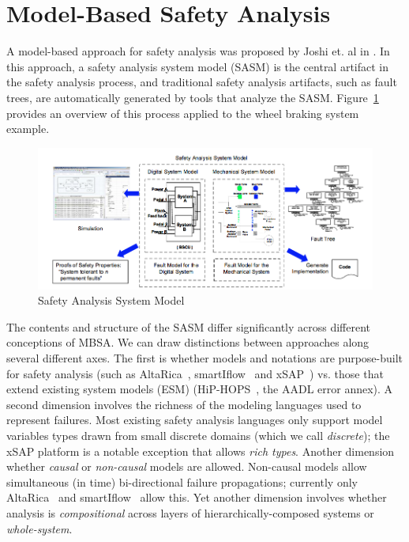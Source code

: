 \section{Model-Based Safety Analysis}


A model-based approach for safety analysis was proposed by Joshi et. al in \cite{Joshi05:Dasc, Joshi05:SafeComp, Joshi07:Hase}.  In this approach, a safety analysis system model (SASM) is the central artifact in the safety analysis process, and traditional safety analysis artifacts, such as fault trees, are automatically generated by tools that analyze the SASM. Figure~\ref{fig:sasm} provides an overview of this process applied to the wheel braking system example.

\begin{figure}
  \centering
 \includegraphics[width=1\textwidth]{images/SASM.png}
  \vspace{-0.1in}
  \caption{Safety Analysis System Model}
  \label{fig:sasm}
\end{figure}

The contents and structure of the SASM differ significantly across different conceptions of MBSA.  We can draw distinctions between approaches along several different axes.  The first is whether models and notations are purpose-built for safety analysis (such as AltaRica~\cite{PROSVIRNOVA2013127}, smartIflow~\cite{info8010007} and xSAP~\cite{DBLP:conf/tacas/BittnerBCCGGMMZ16}) vs. those that extend existing system models (ESM) (HiP-HOPS~\cite{CHEN201391}, the AADL error annex\cite{SAEAS}).  A second dimension involves the richness of the modeling languages used to represent failures.  Most existing safety analysis languages only support model variables types drawn from small discrete domains (which we call {\em discrete}); the xSAP platform is a notable exception that allows {\em rich types}.  Another dimension whether {\em causal } or {\em non-causal} models are allowed.  Non-causal models allow simultaneous (in time) bi-directional failure propagations; currently only AltaRica~\cite{PROSVIRNOVA2013127} and smartIflow~\cite{info8010007} allow this.  Yet another dimension involves whether analysis is {\em compositional} across layers of hierarchically-composed systems or {\em whole-system}.

